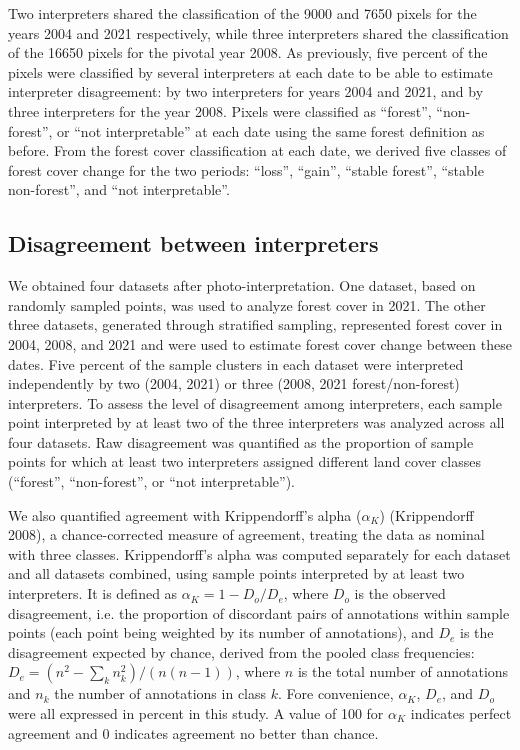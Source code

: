 \documentclass[paper=a4, fontsize=12pt, DIV=13, english, dvipsnames]{scrartcl}
\makeatletter
\newcommand{\cslcitation}[2]
 {\protect\hyper@linkstart{cite}{citeproc_bib_item_#1}#2\hyper@linkend}
\makeatother
\begin{document}
Two interpreters shared the classification of the 9000 and 7650 pixels for the years 2004 and 2021 respectively, while three interpreters shared the classification of the 16650 pixels for the pivotal year 2008. As previously, five percent of the pixels were classified by several interpreters at each date to be able to estimate interpreter disagreement: by two interpreters for years 2004 and 2021, and by three interpreters for the year 2008. Pixels were classified as ``forest'', ``non-forest'', or ``not interpretable'' at each date using the same forest definition as before. From the forest cover classification at each date, we derived five classes of forest cover change for the two periods: ``loss'', ``gain'', ``stable forest'', ``stable non-forest'', and ``not interpretable''.
\subsection{Disagreement between interpreters}
\label{sec:orgd9e3561}

We obtained four datasets after photo-interpretation. One dataset, based on randomly sampled points, was used to analyze forest cover in 2021. The other three datasets, generated through stratified sampling, represented forest cover in 2004, 2008, and 2021 and were used to estimate forest cover change between these dates. Five percent of the sample clusters in each dataset were interpreted independently by two (2004, 2021) or three (2008, 2021 forest/non-forest) interpreters. To assess the level of disagreement among interpreters, each sample point interpreted by at least two of the three interpreters was analyzed across all four datasets. Raw disagreement was quantified as the proportion of sample points for which at least two interpreters assigned different land cover classes (``forest'', ``non-forest'', or ``not interpretable'').

We also quantified agreement with Krippendorff's alpha (\(\alpha_{K}\)) (\cslcitation{7}{Krippendorff 2008}), a chance-corrected measure of agreement, treating the data as nominal with three classes. Krippendorff's alpha was computed separately for each dataset and all datasets combined, using sample points interpreted by at least two interpreters. It is defined as \(\alpha_{K} = 1 - D_{o} / D_{e}\), where \(D_{o}\) is the observed disagreement, i.e. the proportion of discordant pairs of annotations within sample points (each point being weighted by its number of annotations), and \(D_{e}\) is the disagreement expected by chance, derived from the pooled class frequencies: \(D_{e} = (n^2 - \sum_k n_k^2) / (n(n-1))\), where \(n\) is the total number of annotations and \(n_k\) the number of annotations in class \(k\). Fore convenience, \(\alpha_{K}\), \(D_{e}\), and \(D_{o}\) were all expressed in percent in this study. A value of 100 for \(\alpha_{K}\) indicates perfect agreement and 0 indicates agreement no better than chance.
\end{document}
